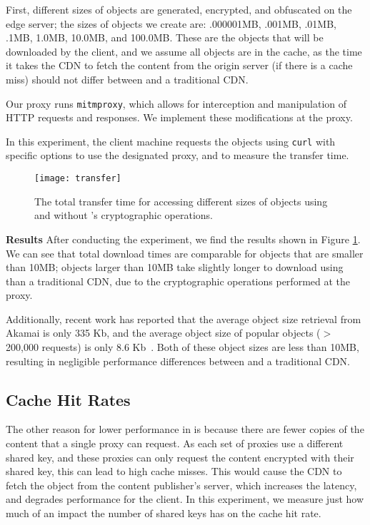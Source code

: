 First, different sizes of objects are generated, encrypted, and obfuscated on the edge server; the sizes of objects we create are: 
.000001MB, .001MB, .01MB, .1MB, 1.0MB, 10.0MB, and 100.0MB.  These are the objects that will be downloaded by the client, and we 
assume all objects are in the cache, as the time it takes the CDN to fetch the content from the origin server (if there is a cache 
miss) should not differ between \system{} and a traditional CDN. 

Our proxy runs {\tt mitmproxy}, which allows for interception and manipulation of HTTP requests and responses.  We implement 
these modifications at the proxy.  

In this experiment, the client machine requests the objects using {\tt curl} with specific options to use the designated proxy, 
and to measure the transfer time.  \\

\begin{figure}[t]
\centering
\texttt{[image: transfer]}
\caption{The total transfer time for accessing different sizes of objects using \system{} and without \system{}'s cryptographic operations.}
\label{fig:transfer}
\end{figure}

{\bf Results}
After conducting the experiment, we find the results shown in Figure \ref{fig:transfer}.  We can see that total download times are comparable 
for objects that are smaller than 10MB; objects larger than 10MB take slightly longer to download using \system{} than a traditional CDN, 
due to the cryptographic operations performed at the proxy.  

Additionally, recent work has reported that the average object size retrieval from Akamai is only 335 Kb, and the average object size 
of popular objects ($>$ 200,000 requests) is only 8.6 Kb~\cite{berger2016achieving}.  Both of these object sizes are less than 10MB, resulting in negligible 
performance differences between \system{} and a traditional CDN.

\subsection{Cache Hit Rates}
The other reason for lower performance in \system{} is because there are fewer copies of the content that a single proxy can request.  As each set 
of proxies use a different shared key, and these proxies can only request the content encrypted with their shared key, this can lead to high cache misses.  
This would cause the CDN to fetch the object from the content publisher's server, which increases the latency, and degrades performance for the client.  
In this experiment, we measure just how much of an impact the number of shared keys has on the cache hit rate.\\

